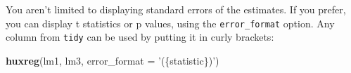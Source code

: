 \documentclass[]{article}
\newenvironment{Shaded}{\begin{snugshade}}{\end{snugshade}}
\newcommand{\DataTypeTok}[1]{\textcolor[rgb]{0.13,0.29,0.53}{#1}}
\newcommand{\KeywordTok}[1]{\textcolor[rgb]{0.13,0.29,0.53}{\textbf{#1}}}
\newcommand{\NormalTok}[1]{#1}
\newcommand{\StringTok}[1]{\textcolor[rgb]{0.31,0.60,0.02}{#1}}
\begin{document}
\FloatBarrier

You aren't limited to displaying standard errors of the estimates. If
you prefer, you can display t statistics or p values, using the
\texttt{error\_format} option. Any column from \texttt{tidy} can be used
by putting it in curly brackets:

\begin{Shaded}
\begin{Highlighting}[]
\KeywordTok{huxreg}\NormalTok{(lm1, lm3, }\DataTypeTok{error_format =} \StringTok{'(\{statistic\})'}\NormalTok{)}
\end{Highlighting}
\end{Shaded}

 
  \providecommand{\huxb}[2]{\arrayrulecolor[RGB]{#1}\global\arrayrulewidth=#2pt}
  \providecommand{\huxvb}[2]{\color[RGB]{#1}\vrule width #2pt}
  \providecommand{\huxtpad}[1]{\rule{0pt}{\baselineskip+#1}}
  \providecommand{\huxbpad}[1]{\rule[-#1]{0pt}{#1}}
\end{document}
